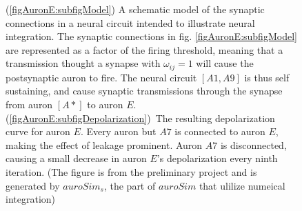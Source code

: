 \begin{figure} %
    \centering
    \caption[An artificial neural circuit to illustrate numerical integration of the $LIF$ neuron. Schematic model and simulation results.]
			{ %
			(\ref{figAuronE:subfigModel}) A schematic model of the synaptic connections in a neural circuit intended to illustrate neural integration.
			The synaptic connections in fig. \ref{figAuronE:subfigModel} are represented as a factor of the firing threshold, meaning that a transmission thought a synapse with $\omega_{ij}=1$ will cause the postsynaptic auron to fire.
			The neural circuit $[A1, A9]$ is thus self sustaining, and cause synaptic transmissions through the synapse from auron $[A*]$ to auron $E$.
			\mbox{(\ref{figAuronE:subfigDepolarization}) The} resulting depolarization curve for auron $E$.
			Every auron but $A7$ is connected to auron $E$, making the effect of leakage prominent.
			Auron $A7$ is disconnected, causing a small decrease in auron $E$'s depolarization every ninth iteration.
			(The figure is from the preliminary project and is generated by $auroSim_s$, the part of $auroSim$ that ulilize numeical integration)
				}
    \label{figExperiment2}
\end{figure}


